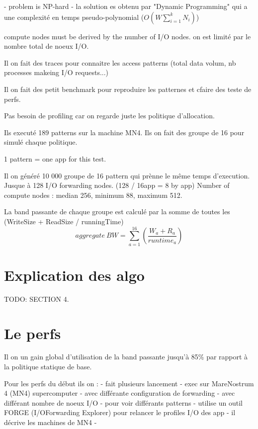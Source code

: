 \documentclass[10pt, a4paper]{article}
\begin{document}
- problem is NP-hard
- la solution es obtenu par "Dynamic Programming" qui a une complexité en temps pseudo-polynomial ($O(W\sum^{k}_{i=1}N_i)$)


compute nodes must be derived by the number of I/O nodes.
on est limité par le nombre total de noeux I/O.

Il on fait des traces pour connaitre les access patterns (total data volum, nb processes makeing I/O requests...)

Il on fait des petit benchmark pour reproduire les patternes et cfaire des teste de perfs.

Pas besoin de profiling car on regarde juste les politique d'allocation.

Ils executé 189 patterns sur la machine MN4.
Ils on fait des groupe de 16 pour simulé chaque politique.

1 pattern = one app for this test.

Il on généré 10 000 groupe de 16 pattern qui prènne le même temps d'execution.
Jusque à 128 I/O forwarding nodes. (128 / 16app = 8 by app)
Number of compute nodes : median 256, minimum 88, maximum 512.

La band passante de chaque groupe est calculé par la somme de toutes les (WriteSize + ReadSize / runningTime)
\begin{equation*}aggregate\ BW=\sum_{a=1}^{16}\left(\frac{W_{a}+R_{a}}{runtime_{a}}\right) \tag{2}\end{equation*}

\section{Explication des algo}

TODO: SECTION 4.

\section{Le perfs}

Il on un gain global d'utilisation de la band passante jusqu'à 85\% par rapport à la politique statique de base.

Pour les perfs du début ils on :
- fait plusieurs lancement
- exec sur MareNostrum 4 (MN4) supercomputer
- avec différante configuration de forwarding
- avec différant nombre de noeux I/O
- pour voir différants patterns
- utilise un outil FORGE (I/OForwarding Explorer) pour relancer le profiles I/O des app
- il décrive les machines de MN4
- 
\end{document}
